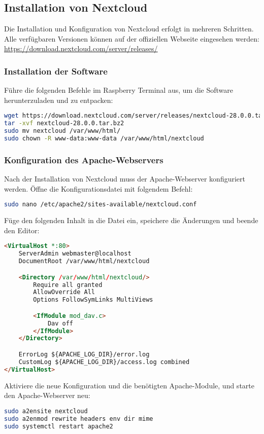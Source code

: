 \documentclass[a4paper,12pt]{article}
\begin{document}
\subsection{Installation von Nextcloud}
Die Installation und Konfiguration von Nextcloud erfolgt in mehreren Schritten. Alle verfügbaren Versionen können auf der offiziellen Webseite eingesehen werden:  
\url{https://download.nextcloud.com/server/releases/}

\subsubsection{Installation der Software}
Führe die folgenden Befehle im Raspberry Terminal aus, um die Software herunterzuladen und zu entpacken:
\begin{lstlisting}[language=bash]
wget https://download.nextcloud.com/server/releases/nextcloud-28.0.0.tar.bz2
tar -xvf nextcloud-28.0.0.tar.bz2
sudo mv nextcloud /var/www/html/
sudo chown -R www-data:www-data /var/www/html/nextcloud
\end{lstlisting}

\subsubsection{Konfiguration des Apache-Webservers}
Nach der Installation von Nextcloud muss der Apache-Webserver konfiguriert werden. Öffne die Konfigurationsdatei mit folgendem Befehl:
\begin{lstlisting}[language=bash]
sudo nano /etc/apache2/sites-available/nextcloud.conf
\end{lstlisting}
Füge den folgenden Inhalt in die Datei ein, speichere die Änderungen und beende den Editor:
\begin{lstlisting}[language=html]
<VirtualHost *:80>
    ServerAdmin webmaster@localhost
    DocumentRoot /var/www/html/nextcloud

    <Directory /var/www/html/nextcloud/>
        Require all granted
        AllowOverride All
        Options FollowSymLinks MultiViews

        <IfModule mod_dav.c>
            Dav off
        </IfModule>
    </Directory>

    ErrorLog ${APACHE_LOG_DIR}/error.log
    CustomLog ${APACHE_LOG_DIR}/access.log combined
</VirtualHost>
\end{lstlisting}

\noindent
Aktiviere die neue Konfiguration und die benötigten Apache-Module, und starte den Apache-Webserver neu:
\begin{lstlisting}[language=bash]
sudo a2ensite nextcloud
sudo a2enmod rewrite headers env dir mime
sudo systemctl restart apache2
\end{lstlisting}
\end{document}
